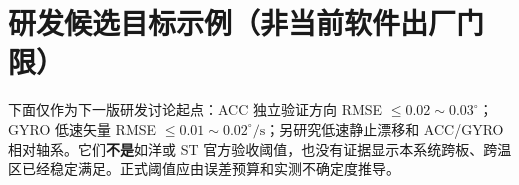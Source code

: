 \section{研发候选目标示例（\textbf{非当前软件出厂门限}）}
下面仅作为下一版研发讨论起点：ACC 独立验证方向 RMSE $\le0.02\sim0.03^\circ$；GYRO 低速矢量 RMSE $\le0.01\sim0.02^\circ/\mathrm s$；另研究低速静止漂移和 ACC/GYRO 相对轴系。它们\textbf{不是}如洋或 ST 官方验收阈值，也没有证据显示本系统跨板、跨温区已经稳定满足。正式阈值应由误差预算和实测不确定度推导。
